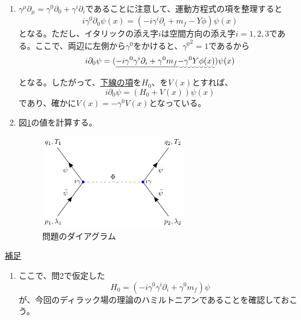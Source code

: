 \documentclass[unicode,a4paper,10pt]{ltjsarticle}
\begin{document}
\begin{enumerate}
  \item
        $\gamma^{\mu}\partial_{\mu}=\gamma^{0}\partial_{0}+\gamma^{i}\partial_{i}$であることに注意して、運動方程式の項を整理すると
        \begin{equation}
          i\gamma^{0}\partial_{0}\psi(x)
          =
          (-i\gamma^{i}\partial_{i}+m_{f}-Y\phi)\psi(x)
        \end{equation}
        となる。ただし、イタリックの添え字$i$は空間方向の添え字$i=1,2,3$である。ここで、両辺に左側から$\gamma^{0}$をかけると、${\gamma^{0}}^2=1$であるから
        \begin{equation}
          i\partial_{0}\psi
          =
          (
          \uline{-i\gamma^{0}\gamma^{i}\partial_{i}
          +
          \gamma^{0}m_{f}
          }
          \uwave{
            -
            \gamma^{0}Y\phi(x)
          }
          )\psi(x)
        \end{equation}
        となる。したがって、\uline{下線の項}を$H_{0}$、を$V(x)$とすれば、
        \begin{equation}
          i\partial_{0}\psi
          =
          (
          H_{0}
          +
          V(x)
          )\psi(x)
        \end{equation}
        であり、確かに$V(x)=-\gamma^{0}V(x)$となっている。


  \item
        図\ref{fig:feynman_diag01}の値を計算する。


        \begin{figure}[ht]
          \centering
          \includegraphics[width=0.6\textwidth]{fig/fig01.pdf}
          \caption{問題のダイアグラム}
          \label{fig:feynman_diag01}
        \end{figure}







\end{enumerate}


\clearpage
\uline{補足}  
\begin{enumerate}
  \item
        ここで、問2で仮定した
        \begin{equation}
          H_{0}
          =
          (-i\gamma^{0}\gamma^{i}\partial_{i}+\gamma^{0}m_{f})\psi
        \end{equation}
        が、今回のディラック場の理論のハミルトニアンであることを確認しておこう。




\end{enumerate}

% 
% 
\end{document}
